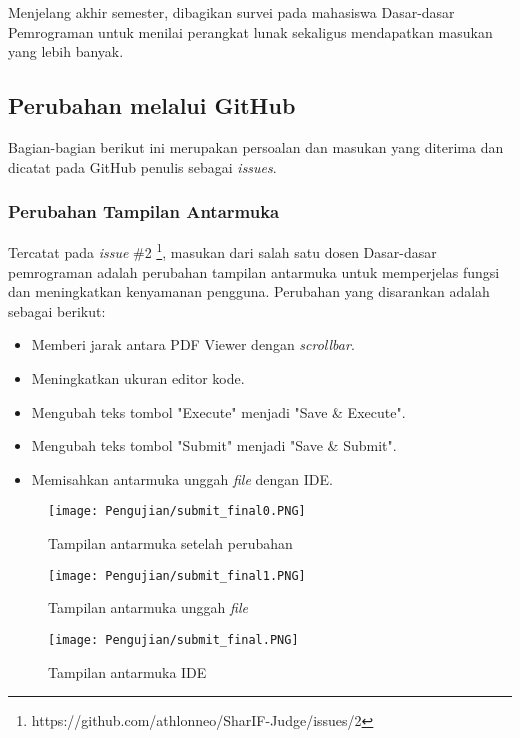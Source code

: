 Menjelang akhir semester, dibagikan survei pada mahasiswa Dasar-dasar Pemrograman untuk menilai perangkat lunak sekaligus mendapatkan masukan yang lebih banyak.

\subsection{Perubahan melalui GitHub}
\label{subsec:github}

Bagian-bagian berikut ini merupakan persoalan dan masukan yang diterima dan dicatat pada GitHub penulis sebagai \textit{issues}.

\subsubsection{Perubahan Tampilan Antarmuka}
Tercatat pada \textit{issue} \#2 \footnote{https://github.com/athlonneo/SharIF-Judge/issues/2}, masukan dari salah satu dosen Dasar-dasar pemrograman adalah perubahan tampilan antarmuka untuk memperjelas fungsi dan meningkatkan kenyamanan pengguna. Perubahan yang disarankan adalah sebagai berikut:
\begin{itemize}
    \item Memberi jarak antara PDF Viewer dengan \textit{scrollbar}.
    \item Meningkatkan ukuran editor kode.
    \item Mengubah teks tombol "Execute" menjadi "Save \& Execute".
    \item Mengubah teks tombol "Submit" menjadi "Save \& Submit".
    \item Memisahkan antarmuka unggah \textit{file} dengan IDE.
\end{itemize}

\begin{figure}[H]
	\centering  
	\texttt{[image: Pengujian/submit\_final0.PNG]}  
	\caption{Tampilan antarmuka setelah perubahan}
	\label{fig:5:submit0} 
\end{figure} 

\begin{figure}[H]
	\centering  
	\texttt{[image: Pengujian/submit\_final1.PNG]}  
	\caption{Tampilan antarmuka unggah \textit{file}}
	\label{fig:5:submit1} 
\end{figure} 

\begin{figure}[H]
	\centering  
	\texttt{[image: Pengujian/submit\_final.PNG]}  
	\caption{Tampilan antarmuka IDE}
	\label{fig:5:submit2} 
\end{figure} 


